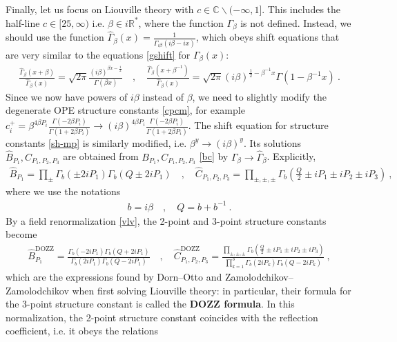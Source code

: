 \documentclass[12pt, a4paper]{article}
\theoremstyle{break}
\begin{document}
Finally, let us focus on Liouville theory with $c\in \mathbb{C}\backslash (-\infty,1]$. This includes the half-line $c\in [25,\infty)$ i.e. $\beta\in i\mathbb{R}^*$, where the function $\Gamma_\beta$ is not defined.
Instead, we should use the function $\hat{\Gamma}_\beta(x) = \frac{1}{\Gamma_{i\beta}(i\beta -ix)}$, which obeys shift equations that are very similar to the equations \eqref{gshift} for $\Gamma_\beta(x)$: 
\begin{align}
 \frac{\hat\Gamma_\beta(x+\beta)}{\hat\Gamma_\beta(x)} = \sqrt{2\pi}\frac{(i\beta)^{\beta x-\frac12}}{\Gamma(\beta x)}
\quad , \quad 
\frac{\hat\Gamma_\beta(x+\beta^{-1})}{\hat\Gamma_\beta(x)} = \sqrt{2\pi}(i\beta)^{\frac12-\beta^{-1}x}\Gamma(1-\beta^{-1}x) \ .
\label{hgshift}
\end{align}
Since we now have powers of $i\beta$ instead of $\beta$, we need to slightly modify the degenerate OPE structure constants \eqref{cpcm}, for example $c_i^+ = \beta^{4\beta P_i}\frac{\Gamma(-2\beta P_i)}{\Gamma(1+2\beta P_i)} \to (i\beta)^{4\beta P_i}\frac{\Gamma(-2\beta P_i)}{\Gamma(1+2\beta P_i)}$. The shift equation for structure constants \eqref{sh-mp} is similarly modified, i.e. $\beta^y \to (i\beta)^y$. Its solutions $\hat B_{P_1},\hat C_{P_1,P_2,P_3}$ are obtained from $B_{P_1},C_{P_1,P_2,P_3}$ \eqref{bc} by $\Gamma_\beta \to \hat\Gamma_\beta$. Explicitly,
\begin{align}
 \boxed{\hat B_{P_1} = \prod_\pm \Gamma_b\left(\pm 2iP_1\right)\Gamma_b\left(Q\pm 2iP_1\right)} \quad , \quad 
 \boxed{\hat C_{P_1,P_2,P_3} = \prod_{\pm,\pm,\pm} \Gamma_b\left(\tfrac{Q}{2} \pm iP_1\pm iP_2\pm iP_3\right)}\ ,
 \label{bci}
\end{align}
where we use the notations 
\begin{align}
 b = i\beta \quad , \quad Q = b + b^{-1} \ . 
 \label{bQ}
\end{align}
By a field renormalization \eqref{vlv}, the 2-point and 3-point structure constants become 
\begin{align}
 \hat B^\text{DOZZ}_{P_1} = \frac{\Gamma_b\left(- 2iP_1\right)\Gamma_b\left(Q+ 2iP_1\right)}{\Gamma_b\left( 2iP_1\right)\Gamma_b\left(Q- 2iP_1\right)} \quad , \quad 
 \hat C^\text{DOZZ}_{P_1,P_2,P_3} = \frac{\prod_{\pm,\pm,\pm} \Gamma_b\left(\tfrac{Q}{2} \pm iP_1\pm iP_2\pm iP_3\right)}{\prod_{k=1}^3 \Gamma_b(2iP_k)\Gamma_b(Q-2iP_k)}\ ,
 \label{dozz}
\end{align}
which are the expressions found by Dorn--Otto and Zamolodchikov--Zamolodchikov when first solving Liouville theory: in particular, their formula for the 3-point structure constant is called the \textbf{DOZZ formula}. In this normalization, the 2-point structure constant coincides with the reflection coefficient, i.e. it obeys the relations 
\end{document}
